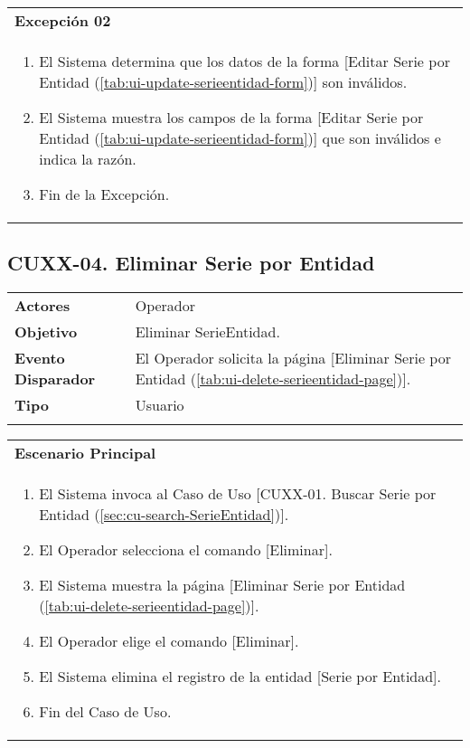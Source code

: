 \begin{tabular}{ p{15.5cm} }
	\textbf{Excepción 02} \\
	\begin{enumerate}
		\item El Sistema determina que los datos de la forma [Editar Serie por Entidad (\ref{tab:ui-update-serieentidad-form})] son inválidos.
		\item El Sistema muestra los campos de la forma [Editar Serie por Entidad (\ref{tab:ui-update-serieentidad-form})] que son inválidos e indica la razón.
		\item Fin de la Excepción.
	\end{enumerate}
\end{tabular}


\clearpage
\subsection{CUXX-04. Eliminar Serie por Entidad} \label{sec:cu-delete-SerieEntidad}

\begin{tabular}{ p{3.5cm} p{11.5cm} }
	\textbf{Actores} & Operador\\
	\textbf{Objetivo} & Eliminar SerieEntidad.\\
	\textbf{Evento Disparador} & El Operador solicita la página [Eliminar Serie por Entidad (\ref{tab:ui-delete-serieentidad-page})].\\
	\textbf{Tipo} & Usuario\\
	\\
\end{tabular}

\begin{tabular}{ p{15.5cm} }
	\textbf{Escenario Principal} \\
	\begin{enumerate}
		\item El Sistema invoca al Caso de Uso [CUXX-01. Buscar Serie por Entidad (\ref{sec:cu-search-SerieEntidad})].
		\item El Operador selecciona el comando [Eliminar].
		\item El Sistema muestra la página [Eliminar Serie por Entidad (\ref{tab:ui-delete-serieentidad-page})].
		\item El Operador elige el comando [Eliminar].
		\item El Sistema elimina el registro de la entidad [Serie por Entidad].
		\item Fin del Caso de Uso.
	\end{enumerate}
\end{tabular}

